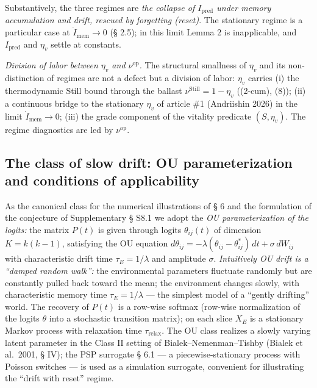 \documentclass[pdflatex,sn-mathphys-ay]{sn-jnl}
\begin{document}
Substantively, the three regimes are \emph{the collapse of \(I_{\text{pred}}\) under memory accumulation and drift, rescued by forgetting (reset)}. The stationary regime is a particular case at \(\dot{I}_{\text{mem}} \to 0\) (§ 2.5); in this limit Lemma 2 is inapplicable, and \(I_{\text{pred}}\) and \(\eta_v\) settle at constants.



\emph{Division of labor between \(\eta_v\) and \(\nu^{\text{op}}\).} The structural smallness of \(\eta_v\) and its non-distinction of regimes are not a defect but a division of labor: \(\eta_v\) carries (i) the thermodynamic Still bound through the ballast \(\nu^{\text{Still}} = 1 - \eta_v\) ((2-cum), (8)); (ii) a continuous bridge to the stationary \(\eta_v\) of article \#1 (Andriishin 2026) in the limit \(\dot{I}_{\text{mem}} \to 0\); (iii) the grade component of the vitality predicate \((S, \eta_v)\). The regime diagnostics are led by \(\nu^{\text{op}}\).



\subsection{The class of slow drift: OU parameterization and conditions of applicability}\label{the-class-of-slow-drift-ou-parameterization-and-conditions-of-applicability}



As the canonical class for the numerical illustrations of § 6 and the formulation of the conjecture of Supplementary § S8.1 we adopt the \emph{OU parameterization of the logits:} the matrix \(P(t)\) is given through logits \(\theta_{ij}(t)\) of dimension \(K = k(k-1)\), satisfying the OU equation \(d\theta_{ij} = -\lambda(\theta_{ij} - \theta_{ij}^*)\,dt + \sigma\,dW_{ij}\) with characteristic drift time \(\tau_E = 1/\lambda\) and amplitude \(\sigma\). \emph{Intuitively OU drift is a ``damped random walk'':} the environmental parameters fluctuate randomly but are constantly pulled back toward the mean; the environment changes slowly, with characteristic memory time \(\tau_E = 1/\lambda\) --- the simplest model of a ``gently drifting'' world. The recovery of \(P(t)\) is a row-wise softmax (row-wise normalization of the logits \(\theta\) into a stochastic transition matrix); on each slice \(X_E\) is a stationary Markov process with relaxation time \(\tau_{\text{relax}}\). The OU class realizes a slowly varying latent parameter in the Class II setting of Bialek--Nemenman--Tishby (Bialek et al.~2001, § IV); the PSP surrogate § 6.1 --- a piecewise-stationary process with Poisson switches --- is used as a simulation surrogate, convenient for illustrating the ``drift with reset'' regime.
\end{document}
